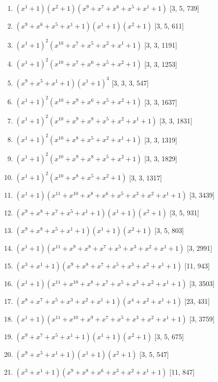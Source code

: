 \documentclass[10pt,twocolumn]{article}
\begin{document}
\begin{enumerate}
\item $(x^{1} + 1)(x^{2} + 1)(x^{9} + x^{7} + x^{6} + x^{5} + x^{1} + 1)$  [3, 5, 739]
\item $(x^{9} + x^{6} + x^{5} + x^{1} + 1)(x^{1} + 1)(x^{2} + 1)$  [3, 5, 611]
\item $(x^{1} + 1)^{2}(x^{10} + x^{7} + x^{5} + x^{2} + x^{1} + 1)$  [3, 3, 1191]
\item $(x^{1} + 1)^{2}(x^{10} + x^{7} + x^{6} + x^{5} + x^{2} + 1)$  [3, 3, 1253]
\item $(x^{9} + x^{5} + x^{1} + 1)(x^{1} + 1)^{3}$  [3, 3, 3, 547]
\item $(x^{1} + 1)^{2}(x^{10} + x^{9} + x^{6} + x^{5} + x^{2} + 1)$  [3, 3, 1637]
\item $(x^{1} + 1)^{2}(x^{10} + x^{9} + x^{8} + x^{5} + x^{2} + x^{1} + 1)$  [3, 3, 1831]
\item $(x^{1} + 1)^{2}(x^{10} + x^{8} + x^{5} + x^{2} + x^{1} + 1)$  [3, 3, 1319]
\item $(x^{1} + 1)^{2}(x^{10} + x^{9} + x^{8} + x^{5} + x^{2} + 1)$  [3, 3, 1829]
\item $(x^{1} + 1)^{2}(x^{10} + x^{8} + x^{5} + x^{2} + 1)$  [3, 3, 1317]
\item $(x^{1} + 1)(x^{11} + x^{10} + x^{8} + x^{6} + x^{5} + x^{3} + x^{2} + x^{1} + 1)$  [3, 3439]
\item $(x^{9} + x^{8} + x^{7} + x^{5} + x^{1} + 1)(x^{1} + 1)(x^{2} + 1)$  [3, 5, 931]
\item $(x^{9} + x^{8} + x^{5} + x^{1} + 1)(x^{1} + 1)(x^{2} + 1)$  [3, 5, 803]
\item $(x^{1} + 1)(x^{11} + x^{9} + x^{8} + x^{7} + x^{5} + x^{3} + x^{2} + x^{1} + 1)$  [3, 2991]
\item $(x^{3} + x^{1} + 1)(x^{9} + x^{8} + x^{7} + x^{5} + x^{3} + x^{2} + x^{1} + 1)$  [11, 943]
\item $(x^{1} + 1)(x^{11} + x^{10} + x^{8} + x^{7} + x^{5} + x^{3} + x^{2} + x^{1} + 1)$  [3, 3503]
\item $(x^{8} + x^{7} + x^{5} + x^{3} + x^{2} + x^{1} + 1)(x^{4} + x^{2} + x^{1} + 1)$  [23, 431]
\item $(x^{1} + 1)(x^{11} + x^{10} + x^{9} + x^{7} + x^{5} + x^{3} + x^{2} + x^{1} + 1)$  [3, 3759]
\item $(x^{9} + x^{7} + x^{5} + x^{1} + 1)(x^{1} + 1)(x^{2} + 1)$  [3, 5, 675]
\item $(x^{9} + x^{5} + x^{1} + 1)(x^{1} + 1)(x^{2} + 1)$  [3, 5, 547]
\item $(x^{3} + x^{1} + 1)(x^{9} + x^{8} + x^{6} + x^{3} + x^{2} + x^{1} + 1)$  [11, 847]

\end{enumerate}
\end{document}
